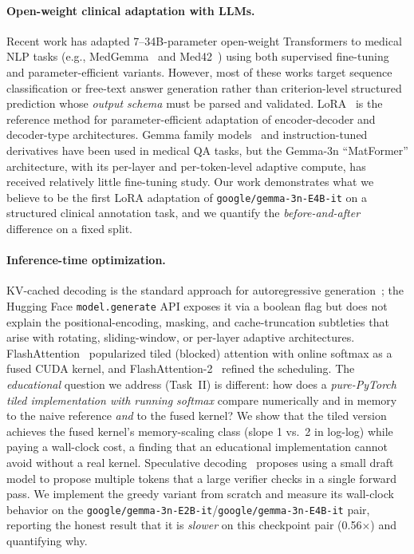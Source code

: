 \documentclass[conference]{IEEEtran}
\newcommand{\code}[1]{\texttt{\small #1}}
\newcommand{\modelname}{\texttt{google/gemma-3n-E4B-it}}
\newcommand{\draftname}{\texttt{google/gemma-3n-E2B-it}}
\begin{document}
\paragraph*{Open-weight clinical adaptation with LLMs.}
Recent work has adapted
7--34B-parameter open-weight Transformers to medical NLP tasks
(e.g., MedGemma~\cite{id6} and Med42~\cite{id7}) using both
supervised fine-tuning and parameter-efficient variants.
However, most of these works target sequence classification or
free-text answer generation rather than criterion-level structured
prediction whose \emph{output schema} must be parsed and validated.
LoRA~\cite{id8} is the reference method for parameter-efficient
adaptation of encoder-decoder and decoder-type architectures. Gemma
family models~\cite{id9,id6} and instruction-tuned derivatives have been
used in medical QA tasks, but the Gemma-3n ``MatFormer'' architecture,
with its per-layer and per-token-level adaptive compute, has received
relatively little fine-tuning study. Our work demonstrates what we
believe to be the first LoRA adaptation of \modelname{} on a
structured clinical annotation task, and we quantify the
\emph{before-and-after} difference on a fixed split.

\paragraph*{Inference-time optimization.}
KV-cached decoding is the standard approach for autoregressive
generation~\cite{id10}; the Hugging Face \code{model.generate} API
exposes it via a boolean flag but does not explain the
positional-encoding, masking, and cache-truncation subtleties that
arise with rotating, sliding-window, or per-layer adaptive
architectures. FlashAttention~\cite{id3} popularized tiled (blocked)
attention with online softmax as a fused CUDA kernel, and
FlashAttention-2~\cite{id4} refined the scheduling. The
\emph{educational} question we address (Task~II) is different: how
does a \emph{pure-PyTorch tiled implementation with running
softmax} compare numerically and in memory to the naive reference
\emph{and} to the fused kernel? We show that the tiled version
achieves the fused kernel's memory-scaling class (slope 1 vs.\
2 in log-log) while paying a wall-clock cost, a finding that an
educational implementation cannot avoid without a real kernel.
Speculative decoding~\cite{id1spec,id2spec} proposes using a small
draft model to propose multiple tokens that a large verifier checks
in a single forward pass. We implement the greedy variant from
scratch and measure its wall-clock behavior on the
\draftname{}/\modelname{} pair, reporting the honest result
that it is \emph{slower} on this checkpoint pair (0.56$\times$) and
quantifying why.
\end{document}
